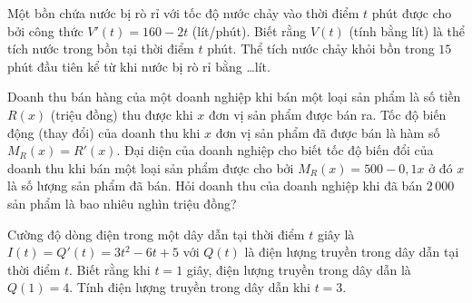 \begin{bt}%
	Một bồn chứa nước bị rò rỉ với tốc độ  nước chảy vào thời điểm $t$ phút được cho bởi công thức $V'(t)=160-2t$ (lít/phút). Biết rằng $V(t)$ (tính bằng lít) là thể tích nước trong bồn tại thời điểm $t$ phút. Thể tích nước chảy khỏi bồn trong $15$ phút đầu tiên kể từ khi nước bị rò rỉ bằng \ldots lít.
\end{bt}

\begin{bt}%
	Doanh thu bán hàng của một doanh nghiệp khi bán một loại sản phẩm là số tiền ${R(x)}$ (triệu đồng) thu được khi $x$ đơn vị sản phẩm được bán ra. Tốc độ biến động (thay đổi) của doanh thu khi $x$ đơn vị sản phẩm đã được bán là hàm số $M_R(x)=R'(x)$. Đại diện của doanh nghiệp cho biết tốc độ biến đổi của doanh thu khi bán  một loại sản phẩm được cho bởi $M_R(x)=500 - 0{,}1x$ ở đó $x$ là số lượng sản phẩm đã bán. Hỏi doanh thu của doanh nghiệp khi đã bán $2\,000$ sản phẩm là bao nhiêu nghìn triệu đồng?
\end{bt}

\begin{bt}%
	Cường độ dòng điện trong một dây dẫn tại thời điểm $t$ giây là  $I(t)=Q'(t)=3t^2-6t+5$ với $Q(t)$ là điện lượng truyền trong dây dẫn tại thời điểm $t$. Biết rằng khi $t=1$ giây, điện lượng truyền trong dây dẫn là $Q(1)=4$. Tính điện lượng truyền trong dây dẫn khi $t=3$.
\end{bt}

